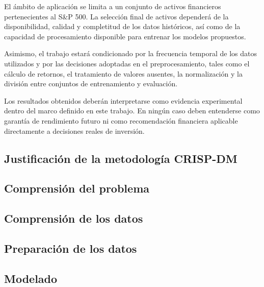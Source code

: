El ámbito de aplicación se limita a un conjunto de activos financieros pertenecientes al S\&P 500. La selección final de activos dependerá de la disponibilidad, calidad y completitud de los datos históricos, así como de la capacidad de procesamiento disponible para entrenar los modelos propuestos.

Asimismo, el trabajo estará condicionado por la frecuencia temporal de los datos utilizados y por las decisiones adoptadas en el preprocesamiento, tales como el cálculo de retornos, el tratamiento de valores ausentes, la normalización y la división entre conjuntos de entrenamiento y evaluación.

Los resultados obtenidos deberán interpretarse como evidencia experimental dentro del marco definido en este trabajo. En ningún caso deben entenderse como garantía de rendimiento futuro ni como recomendación financiera aplicable directamente a decisiones reales de inversión.

\subsection{Justificación de la metodología CRISP-DM}

\subsection{Comprensión del problema}

\subsection{Comprensión de los datos}

\subsection{Preparación de los datos}

\subsection{Modelado}

